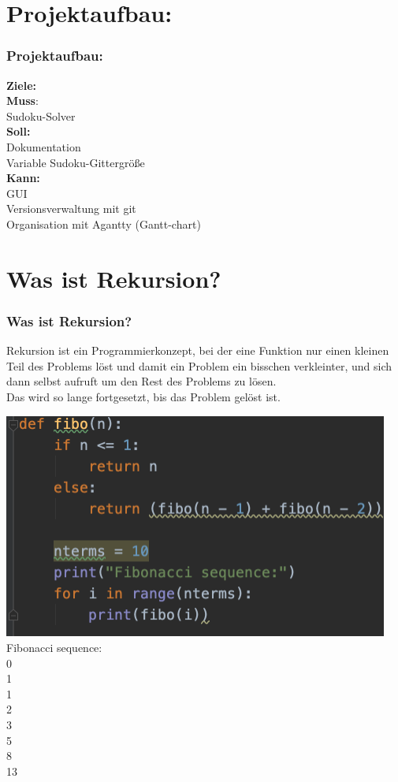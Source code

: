 \documentclass{beamer}
\begin{document}
\section{Projektaufbau:}
\begin{frame}
	\frametitle{Projektaufbau:} 
	\textbf{Ziele:}\\
	\textbf{Muss}:\\
	 Sudoku-Solver\\
	\textbf{Soll:} \\
	Dokumentation\\
	Variable Sudoku-Gittergröße\\
	\textbf{Kann:} \\
	GUI\\
	Versionsverwaltung mit git\\
	Organisation mit Agantty (Gantt-chart)
\end{frame}

\section{Was ist Rekursion?}
\begin{frame}
	\frametitle{Was ist Rekursion?} 
	\begin{minipage}{0.48\textwidth}
		Rekursion ist ein Programmierkonzept, bei der eine Funktion nur einen kleinen Teil des Problems löst und damit ein Problem ein bisschen verkleinter, und sich dann selbst aufruft um den Rest des Problems zu lösen.\\
		Das wird so lange fortgesetzt, bis das Problem gelöst ist.
	\end{minipage}
	\begin{minipage}{0.48\textwidth}
	\centering
	\includegraphics[width=0.95\textwidth]{img/fibo.png}
	\flushleft
	Fibonacci sequence:\\
	0\\
	1\\
	1\\
	2\\
	3\\
	5\\
	8\\
	13\\
	\end{minipage}
\end{frame}
\end{document}
